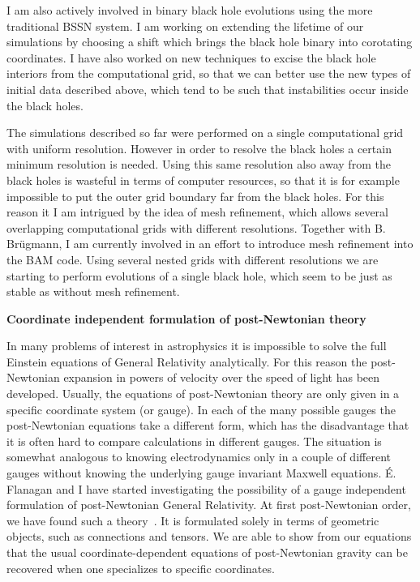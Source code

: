 \documentclass[11pt]{article}
\begin{document}
\begin{spacing}{0.95}
I am also actively involved in binary black hole evolutions using the more
traditional BSSN system.  I am working on extending the lifetime of our
simulations by choosing a shift which brings the black hole binary into
corotating coordinates. I have also worked on new techniques to excise the
black hole interiors from the computational grid, so that we can better use
the new types of initial data described above, which tend to be such that
instabilities occur inside the black holes.

The simulations described so far were performed on a single computational
grid with uniform resolution. However in order to resolve the black holes a
certain minimum resolution is needed. Using this same resolution also away
from the black holes is wasteful in terms of computer resources, so that it
is for example impossible to put the outer grid boundary far from the black
holes. For this reason it I am intrigued by the idea of mesh refinement,
which allows several overlapping computational grids with different
resolutions. Together with B. Br\"ugmann, I am currently involved in an
effort to introduce mesh refinement into the BAM code.  Using several nested
grids with different resolutions we are starting to perform evolutions of a
single black hole, which seem to be just as stable as without mesh
refinement.







\medskip %
\noindent
{\bf Coordinate independent formulation of post-Newtonian theory} 
\smallskip

In many problems of interest in astrophysics it is impossible to solve the
full Einstein equations of General Relativity analytically. For this reason
the post-Newtonian expansion in powers of velocity over the speed of light
has been developed. Usually, the equations of post-Newtonian theory are only
given in a specific coordinate system (or gauge). In each of the many
possible gauges the post-Newtonian equations take a different form, which
has the disadvantage that it is often hard to compare calculations in
different gauges. The situation is somewhat analogous to knowing
electrodynamics only in a couple of different gauges without knowing the
underlying gauge invariant Maxwell equations.
\'E. Flanagan and I have started investigating the possibility of
a gauge independent formulation of post-Newtonian General Relativity. At
first post-Newtonian order, we have found such a theory~\cite{Tichy03}. It
is formulated solely in terms of geometric objects, such as connections and
tensors. We are able to show from our equations that the usual
coordinate-dependent equations of post-Newtonian gravity can be recovered
when one specializes to specific coordinates.  





\end{spacing}
\end{document}
